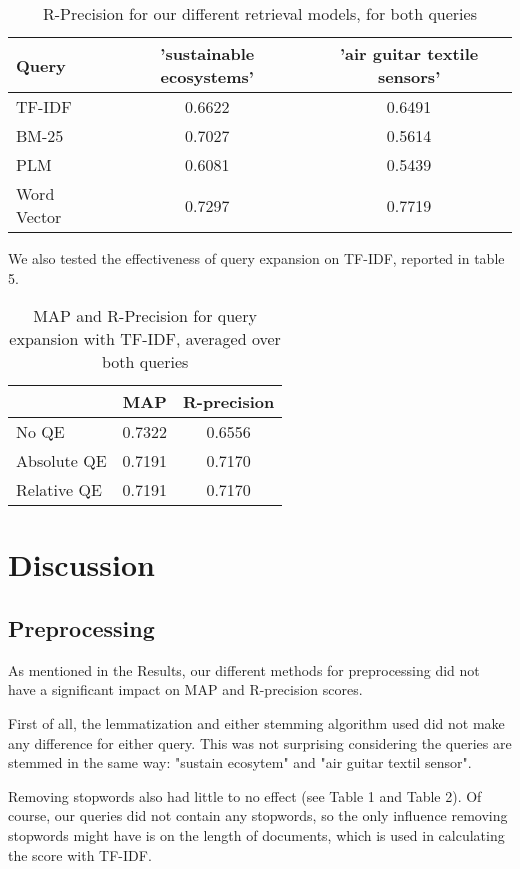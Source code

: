 \documentclass{article}
\begin{document}
\begin{table}[h]
\caption{R-Precision for our different retrieval models, for both queries}
\begin{tabular}{|l|c|c|}
\hline
Query & 'sustainable ecosystems' & 'air guitar textile sensors' \\ \hline
TF-IDF & 0.6622 & 0.6491 \\ \hline
BM-25 & 0.7027 & 0.5614 \\ \hline
PLM & 0.6081 & 0.5439 \\ \hline
Word Vector & 0.7297 & 0.7719 \\ \hline
\end{tabular}
\end{table}

We also tested the effectiveness of query expansion on TF-IDF, reported in table 5.

\begin{table}[h]
\caption{MAP and R-Precision for query expansion with TF-IDF, averaged over both queries}
\begin{tabular}{|l|c|c|}
\hline
 & MAP & R-precision \\ \hline
No QE & 0.7322 & 0.6556 \\ \hline
Absolute QE & 0.7191 & 0.7170 \\ \hline
Relative QE & 0.7191 & 0.7170 \\ \hline
\end{tabular}
\end{table}

\section*{Discussion}

\subsection*{Preprocessing}

As mentioned in the Results, our different methods for preprocessing did not have a significant impact on MAP and R-precision scores. 

First of all, the lemmatization and either stemming algorithm used did not make any difference for either query. This was not surprising considering the queries are stemmed in the same way: "sustain ecosytem" and "air guitar textil sensor". 

Removing stopwords also had little to no effect (see Table 1 and Table 2). Of course, our queries did not contain any stopwords, so the only influence removing stopwords might have is on the length of documents, which is used in calculating the score with TF-IDF. 
\end{document}
